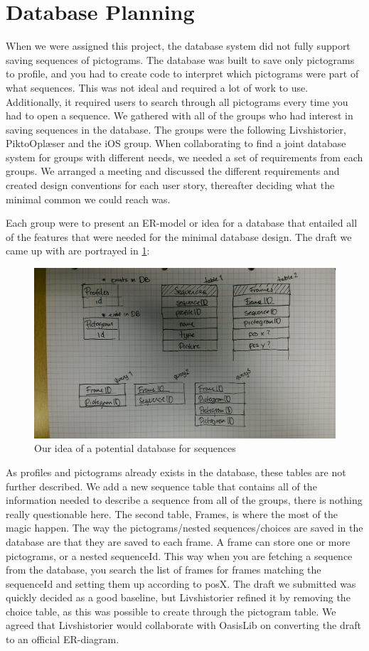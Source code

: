 \section{Database Planning}\label{sec:database_planning}

When we were assigned this project, the database system did not fully support saving sequences of pictograms. The database was built to save only pictograms to profile, and you had to create code to interpret which pictograms were part of what sequences. This was not ideal and required a lot of work to use. Additionally, it required users to search through all pictograms every time you had to open a sequence. We gathered with all of the groups who had interest in saving sequences in the database. The groups were the following Livshistorier, PiktoOplæser and the iOS group.
When collaborating to find a joint database system for groups with different needs, we needed a set of requirements from each groups. We arranged a meeting and discussed the different requirements and created design conventions for each user story, thereafter deciding what the minimal common we could reach was. 

Each group were to present an ER-model or idea for a database that entailed all of the features that were needed for the minimal database design. The draft we came up with are portrayed in \ref{fig:DBdescription}:
\begin{figure}
\centering
\includegraphics[width=0.7\linewidth]{Pics/ourDBdescription}
\caption{Our idea of a potential database for sequences}
\label{fig:DBdescription}
\end{figure}

As profiles and pictograms already exists in the database, these tables are not further described. We add a new sequence table that contains all of the information needed to describe a sequence from all of the groups, there is nothing really questionable here. The second table, Frames, is where the most of the magic happen. The way the pictograms/nested sequences/choices are saved in the database are that they are saved to each frame. A frame can store one or more pictograms, or a nested sequenceId. This way when you are fetching a sequence from the database, you search the list of frames for frames matching the sequenceId and setting them up according to posX.\newline
\newline
The draft we submitted was quickly decided as a good baseline, but Livshistorier refined it by removing the choice table, as this was possible to create through the pictogram table. We agreed that Livshistorier would collaborate with OasisLib on converting the draft to an official ER-diagram. 